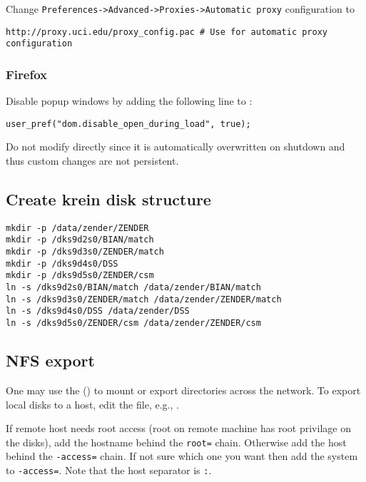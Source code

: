 \documentclass[12pt,twoside]{article}
\begin{document}
Change \verb'Preferences->Advanced->Proxies->Automatic proxy'
configuration to
\begin{verbatim}
http://proxy.uci.edu/proxy_config.pac # Use for automatic proxy configuration 
\end{verbatim}

\subsubsection{Firefox}\label{sxn:moz}
Disable popup windows by adding the following line to :
\begin{verbatim}
user_pref("dom.disable_open_during_load", true);
\end{verbatim}
Do not modify  directly since it is automatically
overwritten on shutdown and thus custom changes are not persistent.

\subsection{Create krein disk structure}\label{sxn:krein}
\begin{verbatim}
mkdir -p /data/zender/ZENDER
mkdir -p /dks9d2s0/BIAN/match
mkdir -p /dks9d3s0/ZENDER/match
mkdir -p /dks9d4s0/DSS
mkdir -p /dks9d5s0/ZENDER/csm
ln -s /dks9d2s0/BIAN/match /data/zender/BIAN/match 
ln -s /dks9d3s0/ZENDER/match /data/zender/ZENDER/match 
ln -s /dks9d4s0/DSS /data/zender/DSS
ln -s /dks9d5s0/ZENDER/csm /data/zender/ZENDER/csm 
\end{verbatim}

\subsection{NFS export}\label{sxn:nfs_xpt}
One may use the  () to
mount or export directories across the network.
To export local disks to a host, edit the  file, e.g.,
.

If remote host needs root access (root on remote machine has root 
privilage on the disks), add the hostname behind the \verb'root='
chain.  Otherwise add the host behind the \verb'-access=' chain.  
If not sure which one you want then add the system to \verb'-access='.
Note that the host separator is \verb':'.
\end{document}

